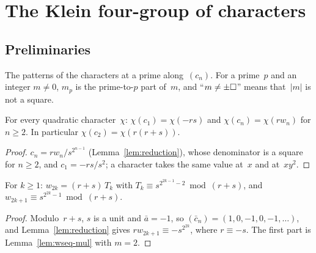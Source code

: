 \chapter{The Klein four-group of characters}
\label{chap:klein}

\section{Preliminaries}
\supporting

The patterns of the characters at a prime along~$(c_n)$. For a prime~$p$ and an integer
$m \ne 0$, $m_p$ is the prime-to-$p$ part of~$m$, and ``$m \ne \pm\square$'' means that~$|m|$ is not
a square.

\begin{lemma}
  \label{lem:sqclass}
  \leanok
  For every quadratic character~$\chi$: $\chi(c_1) = \chi(-rs)$ and $\chi(c_n) = \chi(r w_n)$ for
  $n \ge 2$. In particular $\chi(c_2) = \chi(r(r+s))$.
\end{lemma}
\begin{proof}
  \leanok
  $c_n = r w_n / s^{2^{n-1}}$ (Lemma~\ref{lem:reduction}), whose denominator is a square for
  $n \ge 2$, and $c_1 = -rs/s^2$; a character takes the same value at~$x$ and at~$x y^2$.
\end{proof}

\begin{lemma}
  \label{lem:strongcong}
  \leanok
  For $k \ge 1$: $w_{2k} = (r + s)\, T_k$ with $T_k \equiv s^{2^{2k-1} - 2} \bmod (r + s)$, and
  $w_{2k+1} \equiv s^{2^{2k} - 1} \bmod (r + s)$.
\end{lemma}
\begin{proof}
  \leanok
  Modulo~$r + s$, $s$ is a unit and $\bar a = -1$, so $(\bar c_n) = (1, 0, -1, 0, -1, \dots)$, and
  Lemma~\ref{lem:reduction} gives $r w_{2k+1} \equiv -s^{2^{2k}}$, where $r \equiv -s$. The first
  part is Lemma~\ref{lem:wseq-mul} with $m = 2$.
\end{proof}

